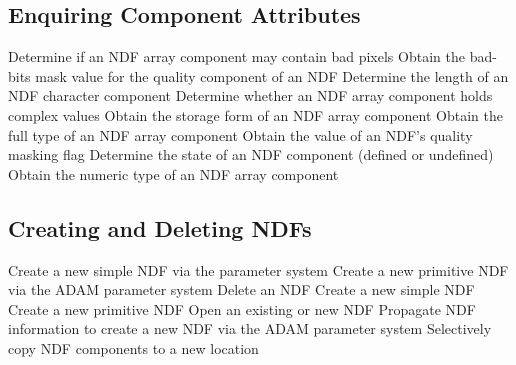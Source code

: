 \subsection{Enquiring Component Attributes}

            {Determine if an NDF array component may contain bad pixels}
            {Obtain the bad-bits mask value for the quality component of an NDF}
            {Determine the length of an NDF character component}
            {Determine whether an NDF array component holds complex values}
            {Obtain the storage form of an NDF array component}
            {Obtain the full type of an NDF array component}
            {Obtain the value of an NDF's quality masking flag}
            {Determine the state of an NDF component (defined or undefined)}
            {Obtain the numeric type of an NDF array component}

\subsection{Creating and Deleting NDFs}

            {Create a new simple NDF via the  parameter system}
            {Create a new primitive NDF via the ADAM parameter system}
            {Delete an NDF}
            {Create a new simple NDF}
            {Create a new primitive NDF}
            {Open an existing or new NDF}
            {Propagate NDF information to create a new NDF via the ADAM parameter system}
            {Selectively copy NDF components to a new location}

